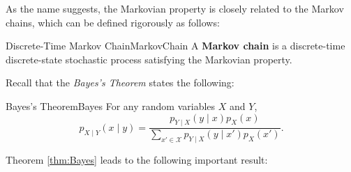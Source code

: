 \documentclass[math, code]{amznotes}
\theoremstyle{remark}
\begin{document}
As the name suggests, the Markovian property is closely related to the Markov chains, which can be defined rigorously as follows:
\begin{dfnbox}{Discrete-Time Markov Chain}{MarkovChain}
    A {\color{red} \textbf{Markov chain}} is a discrete-time discrete-state stochastic process satisfying the Markovian property.
\end{dfnbox}
Recall that the \textit{Bayes's Theorem} states the following:
\begin{thmbox}{Bayes's Theorem}{Bayes}
    For any random variables $X$ and $Y$, 
    \begin{equation*}
        p_{X \mid Y}\left(x \mid y\right) = \frac{p_{Y \mid X}\left(y \mid x\right)p_X\left(x\right)}{\sum_{x' \in \mathcal{X}}p_{Y \mid X}\left(y \mid x'\right)p_X\left(x'\right)}.
    \end{equation*}
\end{thmbox}
Theorem \ref{thm:Bayes} leads to the following important result:
\end{document}
